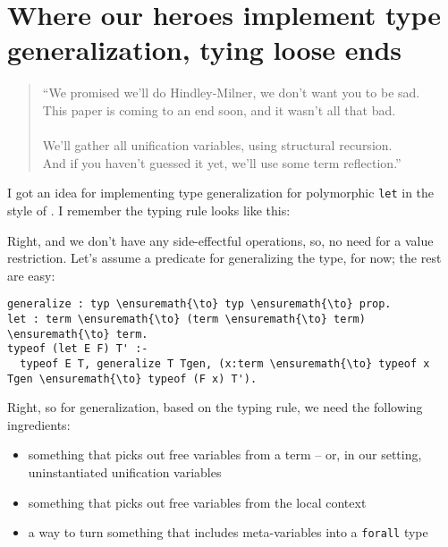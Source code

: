 \section{Where our heroes implement type generalization, tying loose
ends}\label{where-our-heroes-implement-type-generalization-tying-loose-ends}

\begin{verse}
``We promised we'll do Hindley-Milner, we don't want you to be sad. \\
This paper is coming to an end soon, and it wasn't all that bad. \\
\hspace{1em}\vspace{-0.5em} \\
We'll gather all unification variables, using structural recursion. \\
And if you haven't guessed it yet, we'll use some term reflection.''
\end{verse}

\heroSTUDENT{} I got an idea for implementing type generalization for
polymorphic \texttt{let} in the style of
\citet{damas1984type,hindley1969principal,milner1978theory}. I remember
the typing rule looks like this:

\vspace{-1.2em}\begin{mathpar}
\end{mathpar}

\heroADVISOR{} Right, and we don't have any side-effectful operations, so, no
need for a value restriction. Let's assume a predicate for generalizing
the type, for now; the rest are easy:

\begin{verbatim}
generalize : typ \ensuremath{\to} typ \ensuremath{\to} prop.
let : term \ensuremath{\to} (term \ensuremath{\to} term) \ensuremath{\to} term.
typeof (let E F) T' :-
  typeof E T, generalize T Tgen, (x:term \ensuremath{\to} typeof x Tgen \ensuremath{\to} typeof (F x) T').
\end{verbatim}

\heroSTUDENT{} Right, so for generalization, based on the typing rule, we need
the following ingredients:

\begin{itemize}
\tightlist
\item
  something that picks out free variables from a term -- or, in our
  setting, uninstantiated unification variables
\item
  something that picks out free variables from the local context
\item
  a way to turn something that includes meta-variables into a
  \texttt{forall} type
\end{itemize}

